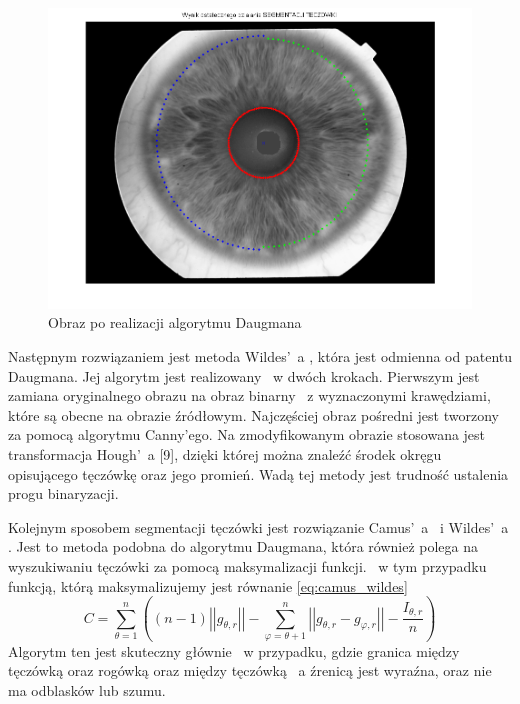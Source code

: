 \begin{center}
\begin{figure}
\label{fig:przykladDaugman}
\includegraphics[scale=0.5]{calosc.png}
\caption{Obraz po realizacji algorytmu Daugmana}
\end{figure}
\end{center}

Następnym rozwiązaniem jest metoda Wildes'~a \cite{Wildes}, która jest odmienna od patentu Daugmana. Jej algorytm jest realizowany ~w dwóch krokach. Pierwszym jest zamiana oryginalnego obrazu na obraz binarny ~z wyznaczonymi krawędziami, które są obecne na obrazie źródłowym. Najczęściej obraz pośredni jest tworzony za pomocą algorytmu Canny'ego. Na zmodyfikowanym obrazie stosowana jest transformacja Hough'~a [9], dzięki której można znaleźć środek okręgu opisującego tęczówkę oraz jego promień. Wadą tej metody jest trudność ustalenia progu binaryzacji.

Kolejnym sposobem segmentacji tęczówki jest rozwiązanie Camus'~a ~i Wildes'~a \cite{Camus}. Jest to metoda podobna do algorytmu Daugmana, która również polega na wyszukiwaniu tęczówki za pomocą maksymalizacji funkcji. ~w tym przypadku funkcją, którą maksymalizujemy jest równanie \ref{eq:camus_wildes} 
\begin{equation}
\label{eq:camus_wildes}
C=\sum_{\theta =1}^{n} ((n-1)\left|\left| g_{\theta,r} \right|\right| - \sum_{\varphi=\theta + 1 } ^{n} \left| \left| g_{\theta,r} - g_{\varphi,r} \right| \right| - \frac{I_{\theta,r}}{n}  )
\end{equation}
Algorytm ten jest skuteczny głównie ~w przypadku, gdzie granica między tęczówką oraz rogówką oraz między tęczówką ~a źrenicą jest wyraźna, oraz nie ma odblasków lub szumu.

